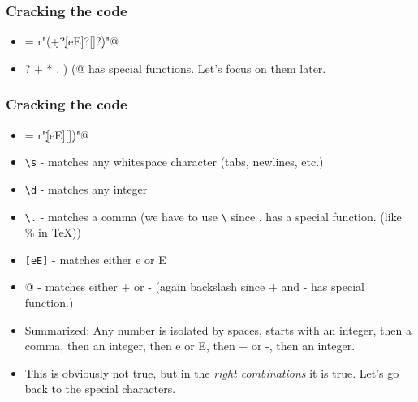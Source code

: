 \documentclass{beamer}
\begin{document}
\begin{frame}[fragile]
\frametitle{Cracking the code}
\scriptsize
\begin{itemize}
 \item \verb@anyNumber = r"\s*(\d+\.?\d*[eE]?[\-\+]?\d*)\s*"@
 \item \verb@? + * . ) (@ has special functions. Let's focus on them later.

\end{itemize}
\normalsize
\end{frame}

\begin{frame}[fragile]
\frametitle{Cracking the code}
\scriptsize
\begin{itemize}
 \item \verb@anyNumber = r"\s\d\.\d[eE][\-\+]\d)\s"@
 \pause \item \verb+\s+ - matches any whitespace character (tabs, newlines, etc.)
 \pause \item \verb+\d+ - matches any integer
 \pause \item \verb+\.+ - matches a comma (we have to use \verb+\+ since . has a special function. (like \% in TeX))
 \pause \item \verb+[eE]+ - matches either e or E 
 \item \verb@[\+\-]@ - matches either + or - (again backslash since + and - has special function.)
 \pause \item Summarized: Any number is isolated by spaces, starts with an integer, then a comma, then an integer, then e or E, then + or -, then an integer.
 \item This is obviously not true, but in the \textit{right combinations} it is true. Let's go back to the special characters.
\end{itemize}
\normalsize
\end{frame}
\end{document}
